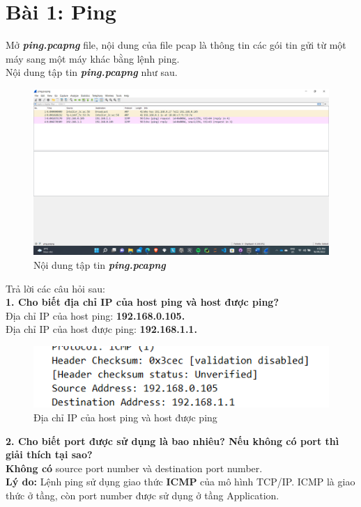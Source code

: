 \section{Bài 1: Ping}
Mở \textbf{\textit{ping.pcapng}} file, nội dung của file pcap là thông tin các gói tin gửi từ một máy sang một máy khác bằng lệnh ping.\\
Nội dung tập tin \textbf{\textit{ping.pcapng}} như sau.
\begin{figure}[H]
\begin{center}
\includegraphics[scale=0.45]{../figures/p1/p1_ping}
\end{center}
\caption{Nội dung tập tin \textbf{\textit{ping.pcapng}}}
\end{figure}
Trả lời các câu hỏi sau:\\
\textbf{1.	Cho biết địa chỉ IP của host ping và host được ping?}\\
Địa chỉ IP của host ping: \textbf{192.168.0.105.}\\
Địa chỉ IP của host được ping: \textbf{192.168.1.1.}
\begin{figure}[H]
\begin{center}
\includegraphics[scale=1]{../figures/p1/p1_r1}
\end{center}
\caption{Địa chỉ IP của host ping và host được ping}
\end{figure}

\textbf{2.	Cho biết port được sử dụng là bao nhiêu? Nếu không có port thì giải thích tại sao?}\\
\textbf{Không có} source port number và destination port number.\\
\textbf{Lý do:} Lệnh ping sử dụng giao thức \textbf{ICMP} của mô hình TCP/IP. ICMP là giao thức ở tầng, còn port number được sử dụng ở tầng Application.

